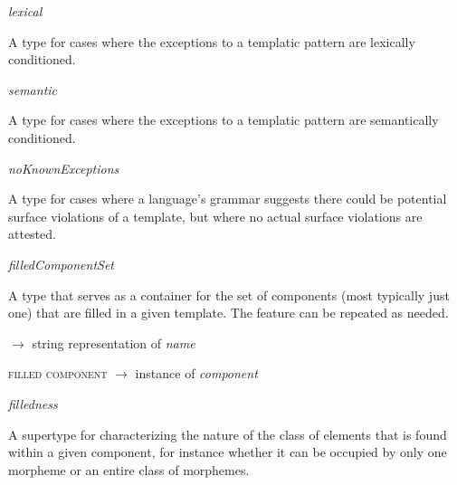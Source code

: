\begin{ontologytop}
\begin{classlist}
		\begin{classlist}

		\item \emph{lexical}
		\hspace{1em}\parbox[t]{\linegoal}{\footnotesize A type for cases where the exceptions to a templatic pattern are lexically conditioned.}


		\item \emph{semantic}
		\hspace{1em}\parbox[t]{\linegoal}{\footnotesize A type for cases where the exceptions to a templatic pattern are semantically conditioned.}


		\end{classlist}

	\item \emph{noKnownExceptions}
	\hspace{1em}\parbox[t]{\linegoal}{\footnotesize A type for cases where a language's grammar suggests there could be potential surface violations of a template, but where no actual surface violations are attested.}


	\end{classlist}

\item \emph{filledComponentSet}
\hspace{1em}\parbox[t]{\linegoal}{\footnotesize A type that serves as a container for the set of components (most typically just one) that are filled in a given template. The  feature can be repeated as needed.}


	\begin{proplist}

	\item \textsc{\name} $\rightarrow$ string representation of \emph{name}

	\item \textsc{filled component} $\rightarrow$ instance of \emph{component}

	\end{proplist}

\item \emph{filledness}
\hspace{1em}\parbox[t]{\linegoal}{\footnotesize A supertype for characterizing the nature of the class of elements that is found within a given component, for instance whether it can be occupied by only one morpheme or an entire class of morphemes.}


	\begin{proplist}


\end{proplist}
\end{ontologytop}
